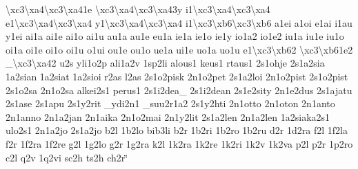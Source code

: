 \begin{DoxyCompactItemize}
\textbackslash{}xc3\textbackslash{}xa4\textbackslash{}xc3\textbackslash{}xa41e \textbackslash{}xc3\textbackslash{}xa4\textbackslash{}xc3\textbackslash{}xa43y i1\textbackslash{}xc3\textbackslash{}xa4\textbackslash{}xc3\textbackslash{}xa4 e1\textbackslash{}xc3\textbackslash{}xa4\textbackslash{}xc3\textbackslash{}xa4 y1\textbackslash{}xc3\textbackslash{}xa4\textbackslash{}xc3\textbackslash{}xa4 i1\textbackslash{}xc3\textbackslash{}xb6\textbackslash{}xc3\textbackslash{}xb6 a1ei a1oi e1ai i1au y1ei ai1a ai1e ai1o ai1u au1a au1e eu1a ie1a ie1o ie1y io1a2 io1e2 iu1a iu1e iu1o oi1a oi1e oi1o oi1u o1ui ou1e ou1o ue1a ui1e uo1a uo1u e1\textbackslash{}xc3\textbackslash{}xb62 \textbackslash{}xc3\textbackslash{}xb61e2 \-\_\-\textbackslash{}xc3\textbackslash{}xa42 u2s yli1o2p ali1a2v 1sp2li alous1 keus1 rtaus1 2s1ohje 2s1a2sia 1a2sian 1a2siat 1a2sioi r2as l2as 2s1o2pisk 2n1o2pet 2s1a2loi 2n1o2pist 2s1o2pist 2s1o2sa 2n1o2sa alkei2s1 perus1 2s1i2dea\-\_\- 2s1i2dean 2s1e2sity 2n1e2dus 2s1ajatu 2s1ase 2s1apu 2s1y2rit \-\_\-ydi2n1 \-\_\-suu2r1a2 2s1y2hti 2n1otto 2n1oton 2n1anto 2n1anno 2n1a2jan 2n1aika 2n1o2mai 2n1y2lit 2s1a2len 2n1a2len 1a2siaka2s1 ulo2s1 2n1a2jo 2s1a2jo b2l 1b2lo bib3li b2r 1b2ri 1b2ro 1b2ru d2r 1d2ra f2l 1f2la f2r 1f2ra 1f2re g2l 1g2lo g2r 1g2ra k2l 1k2ra 1k2re 1k2ri 1k2v 1k2va p2l p2r 1p2ro c2l q2v 1q2vi sc2h ts2h ch2r\char`\"{}
\end{DoxyCompactItemize}


